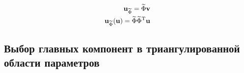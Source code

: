 \begin{align}
    \unk_{\widetilde{\Phi}} = \widetilde{\Phi} \vunk \\
    \unk_{\widetilde{\Phi}}(\unk) = \widetilde{\Phi} \transpose{\widetilde{\Phi}} \unk
\end{align}

\begin{figure}[ht]
    \caption{ \cite{Elizarev2022}}\label{fig:POD}
\end{figure}

\subsection{Выбор главных компонент в триангулированной области параметров}

\begin{figure}[ht]
    \caption{ \cite{Elizarev2022}}\label{fig:params}
\end{figure}

